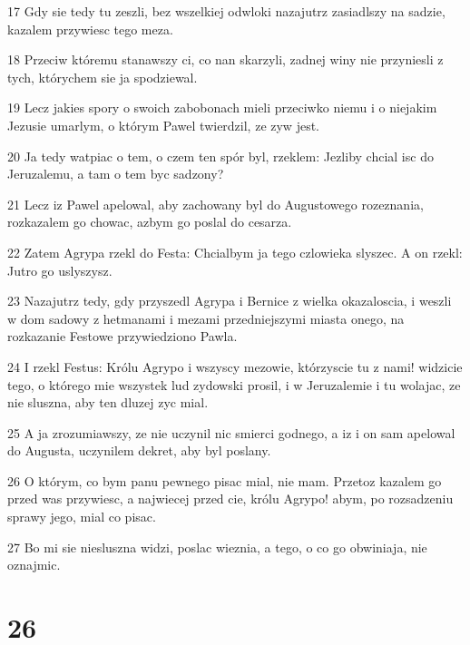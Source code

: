 \par 17 Gdy sie tedy tu zeszli, bez wszelkiej odwloki nazajutrz zasiadlszy na sadzie, kazalem przywiesc tego meza.
\par 18 Przeciw któremu stanawszy ci, co nan skarzyli, zadnej winy nie przyniesli z tych, którychem sie ja spodziewal.
\par 19 Lecz jakies spory o swoich zabobonach mieli przeciwko niemu i o niejakim Jezusie umarlym, o którym Pawel twierdzil, ze zyw jest.
\par 20 Ja tedy watpiac o tem, o czem ten spór byl, rzeklem: Jezliby chcial isc do Jeruzalemu, a tam o tem byc sadzony?
\par 21 Lecz iz Pawel apelowal, aby zachowany byl do Augustowego rozeznania, rozkazalem go chowac, azbym go poslal do cesarza.
\par 22 Zatem Agrypa rzekl do Festa: Chcialbym ja tego czlowieka slyszec. A on rzekl: Jutro go uslyszysz.
\par 23 Nazajutrz tedy, gdy przyszedl Agrypa i Bernice z wielka okazaloscia, i weszli w dom sadowy z hetmanami i mezami przedniejszymi miasta onego, na rozkazanie Festowe przywiedziono Pawla.
\par 24 I rzekl Festus: Królu Agrypo i wszyscy mezowie, którzyscie tu z nami! widzicie tego, o którego mie wszystek lud zydowski prosil, i w Jeruzalemie i tu wolajac, ze nie sluszna, aby ten dluzej zyc mial.
\par 25 A ja zrozumiawszy, ze nie uczynil nic smierci godnego, a iz i on sam apelowal do Augusta, uczynilem dekret, aby byl poslany.
\par 26 O którym, co bym panu pewnego pisac mial, nie mam. Przetoz kazalem go przed was przywiesc, a najwiecej przed cie, królu Agrypo! abym, po rozsadzeniu sprawy jego, mial co pisac.
\par 27 Bo mi sie niesluszna widzi, poslac wieznia, a tego, o co go obwiniaja, nie oznajmic.

\chapter{26}

